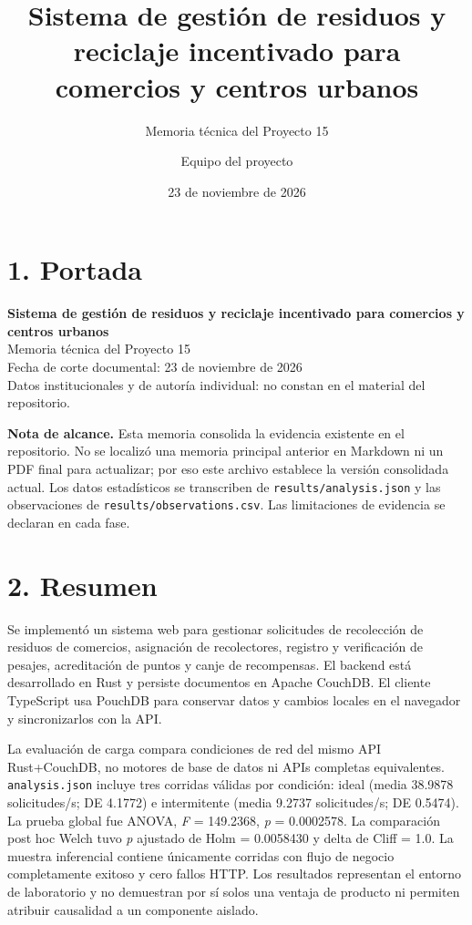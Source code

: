 \documentclass[
  spanish,
  12pt,
  a4paper,
]{article}
\title{Sistema de gestión de residuos y reciclaje incentivado para
comercios y centros urbanos}
\subtitle{Memoria técnica del Proyecto 15}
\author{Equipo del proyecto}
\date{23 de noviembre de 2026}
\begin{document}
\maketitle

{
\setcounter{tocdepth}{2}
\tableofcontents
}
\newpage

\section{1. Portada}\label{portada}

\textbf{Sistema de gestión de residuos y reciclaje incentivado para
comercios y centros urbanos}\\
Memoria técnica del Proyecto 15\\
Fecha de corte documental: 23 de noviembre de 2026\\
Datos institucionales y de autoría individual: no constan en el material
del repositorio.

\textbf{Nota de alcance.} Esta memoria consolida la evidencia existente
en el repositorio. No se localizó una memoria principal anterior en
Markdown ni un PDF final para actualizar; por eso este archivo establece
la versión consolidada actual. Los datos estadísticos se transcriben de
\texttt{results/analysis.json} y las observaciones de
\texttt{results/observations.csv}. Las limitaciones de evidencia se
declaran en cada fase.

\section{2. Resumen}\label{resumen}

Se implementó un sistema web para gestionar solicitudes de recolección
de residuos de comercios, asignación de recolectores, registro y
verificación de pesajes, acreditación de puntos y canje de recompensas.
El backend está desarrollado en Rust y persiste documentos en Apache
CouchDB. El cliente TypeScript usa PouchDB para conservar datos y
cambios locales en el navegador y sincronizarlos con la API.

La evaluación de carga compara condiciones de red del mismo API
Rust+CouchDB, no motores de base de datos ni APIs completas
equivalentes. \texttt{analysis.json} incluye tres corridas válidas por
condición: ideal (media 38.9878 solicitudes/s; DE 4.1772) e intermitente
(media 9.2737 solicitudes/s; DE 0.5474). La prueba global fue ANOVA,
\emph{F} = 149.2368, \emph{p} = 0.0002578. La comparación post hoc Welch
tuvo \emph{p} ajustado de Holm = 0.0058430 y delta de Cliff = 1.0. La
muestra inferencial contiene únicamente corridas con flujo de negocio
completamente exitoso y cero fallos HTTP. Los resultados representan el
entorno de laboratorio y no demuestran por sí solos una ventaja de
producto ni permiten atribuir causalidad a un componente aislado.
\end{document}
